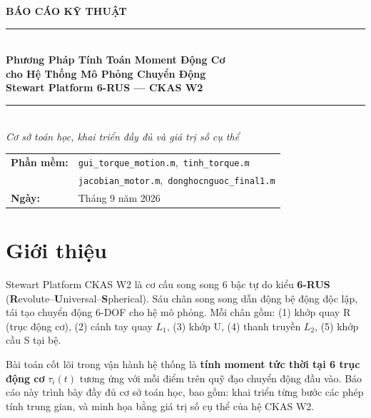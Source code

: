\documentclass[12pt,a4paper]{article}
\begin{document}

\begin{titlepage}
\centering\vspace*{1.5cm}
{\Large\bfseries BÁO CÁO KỸ THUẬT}\\[0.4cm]
{\rule{\linewidth}{0.8mm}}\\[0.5cm]
{\LARGE\bfseries Phương Pháp Tính Toán Moment Động Cơ\\[0.25cm]
cho Hệ Thống Mô Phỏng Chuyển Động\\[0.25cm]
Stewart Platform 6-RUS --- CKAS W2}\\[0.35cm]
{\rule{\linewidth}{0.8mm}}\\[1cm]
{\large\itshape Cơ sở toán học, khai triển đầy đủ và giá trị số cụ thể}\\[2.5cm]
\begin{tabular}{@{}ll@{}}
\bfseries Phần mềm: & \texttt{gui\_torque\_motion.m},\ \texttt{tinh\_torque.m}\\
& \texttt{jacobian\_motor.m},\ \texttt{donghocnguoc\_final1.m}\\[0.4cm]
\bfseries Ngày: & Tháng 9 năm 2026 \\
\end{tabular}\vfill
\end{titlepage}

\tableofcontents\newpage

\section{Giới thiệu}

Stewart Platform CKAS W2 là cơ cấu song song 6 bậc tự do kiểu \textbf{6-RUS}
(\textbf{R}evolute--\textbf{U}niversal--\textbf{S}pherical). Sáu chân song song
dẫn động bệ động độc lập, tái tạo chuyển động 6-DOF cho hệ mô phỏng. Mỗi chân
gồm: (1) khớp quay R (trục động cơ), (2) cánh tay quay $L_1$, (3) khớp U,
(4) thanh truyền $L_2$, (5) khớp cầu S tại bệ.

Bài toán cốt lõi trong vận hành hệ thống là \textbf{tính moment tức thời tại 6 trục
động cơ} $\tau_i(t)$ tương ứng với mỗi điểm trên quỹ đạo chuyển động đầu vào. Báo cáo
này trình bày đầy đủ cơ sở toán học, bao gồm: khai triển từng bước các phép tính trung
gian, và minh họa bằng giá trị số cụ thể của hệ CKAS W2.

\end{document}

